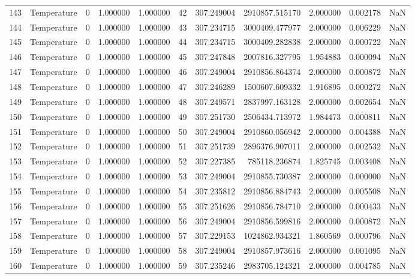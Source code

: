 \begin{tabular}{llrrrrrrrrr}
143 & Temperature & 0 & 1.000000 & 1.000000 & 42 & 307.249004 & 2910857.515170 & 2.000000 & 0.002178 & NaN \\
144 & Temperature & 0 & 1.000000 & 1.000000 & 43 & 307.234715 & 3000409.477977 & 2.000000 & 0.006229 & NaN \\
145 & Temperature & 0 & 1.000000 & 1.000000 & 44 & 307.234715 & 3000409.282838 & 2.000000 & 0.000722 & NaN \\
146 & Temperature & 0 & 1.000000 & 1.000000 & 45 & 307.247848 & 2007816.327795 & 1.954883 & 0.000094 & NaN \\
147 & Temperature & 0 & 1.000000 & 1.000000 & 46 & 307.249004 & 2910856.864374 & 2.000000 & 0.000872 & NaN \\
148 & Temperature & 0 & 1.000000 & 1.000000 & 47 & 307.246289 & 1500607.609332 & 1.916895 & 0.000272 & NaN \\
149 & Temperature & 0 & 1.000000 & 1.000000 & 48 & 307.249571 & 2837997.163128 & 2.000000 & 0.002654 & NaN \\
150 & Temperature & 0 & 1.000000 & 1.000000 & 49 & 307.251730 & 2506434.713972 & 1.984473 & 0.000811 & NaN \\
151 & Temperature & 0 & 1.000000 & 1.000000 & 50 & 307.249004 & 2910860.056942 & 2.000000 & 0.004388 & NaN \\
152 & Temperature & 0 & 1.000000 & 1.000000 & 51 & 307.251739 & 2896376.907011 & 2.000000 & 0.002532 & NaN \\
153 & Temperature & 0 & 1.000000 & 1.000000 & 52 & 307.227385 & 785118.236874 & 1.825745 & 0.003408 & NaN \\
154 & Temperature & 0 & 1.000000 & 1.000000 & 53 & 307.249004 & 2910855.730387 & 2.000000 & 0.000000 & NaN \\
155 & Temperature & 0 & 1.000000 & 1.000000 & 54 & 307.235812 & 2910856.884743 & 2.000000 & 0.005508 & NaN \\
156 & Temperature & 0 & 1.000000 & 1.000000 & 55 & 307.251626 & 2910856.784710 & 2.000000 & 0.000433 & NaN \\
157 & Temperature & 0 & 1.000000 & 1.000000 & 56 & 307.249004 & 2910856.599816 & 2.000000 & 0.000872 & NaN \\
158 & Temperature & 0 & 1.000000 & 1.000000 & 57 & 307.229153 & 1024862.934321 & 1.860569 & 0.000796 & NaN \\
159 & Temperature & 0 & 1.000000 & 1.000000 & 58 & 307.249004 & 2910857.973616 & 2.000000 & 0.001095 & NaN \\
160 & Temperature & 0 & 1.000000 & 1.000000 & 59 & 307.235246 & 2983705.124321 & 2.000000 & 0.004785 & NaN \\

\end{tabular}
